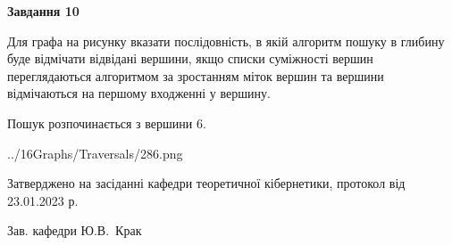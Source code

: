 \documentclass[12pt, ukrainian]{article}
\begin{document}
{\begin {large}
{\begin {center}\textbf{Завдання 10}\end {center}}\par
Для графа на рисунку вказати послідовність, в якій алгоритм пошуку в глибину буде відмічати відвідані вершини, якщо списки суміжності вершин переглядаються алгоритмом за зростанням міток вершин та вершини відмічаються на першому вход\-женні у вершину.\par
Пошук розпочинається з вершини 6.\par

\begin{center}
	{../16Graphs/Traversals/286.png}
\end{center}\par
\newpage


\end {large}
}
{\smallskip \begin {small} Затверджено на засіданні кафедри теоретичної кібернетики, протокол  від   23.01.2023 р.\par\smallskip\smallskip
{\parbox {6.5 cm}{Зав. кафедри \dotfill Ю.В.~Крак}} \end{small}}
\end{document}
